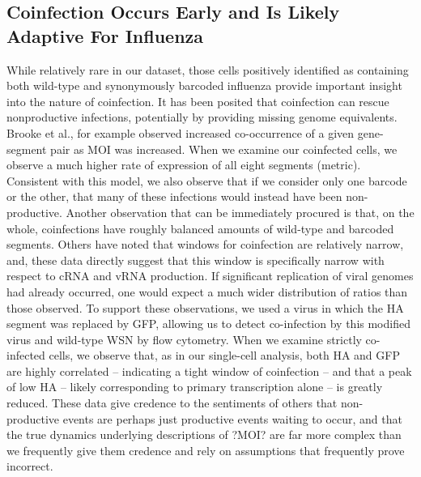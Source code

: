 \documentclass[9pt,lineno]{elife}
\begin{document}
\subsection{Coinfection Occurs Early and Is Likely Adaptive For Influenza}
	While relatively rare in our dataset, those cells positively identified as containing both wild-type and synonymously barcoded influenza provide important insight into the nature of coinfection. It has been posited that coinfection can rescue nonproductive infections, potentially by providing missing genome equivalents. Brooke et al., for example observed increased co-occurrence of a given gene-segment pair as MOI was increased. When we examine our coinfected cells, we observe a much higher rate of expression of all eight segments (metric). Consistent with this model, we also observe that if we consider only one barcode or the other, that many of these infections would instead have been non-productive. Another observation that can be immediately procured is that, on the whole, coinfections have roughly balanced amounts of wild-type and barcoded segments. Others have noted that windows for coinfection are relatively narrow, and, these data directly suggest that this window is specifically narrow with respect to cRNA and vRNA production. If significant replication of viral genomes had already occurred, one would expect a much wider distribution of ratios than those observed. To support these observations, we used a virus in which the HA segment was replaced by GFP, allowing us to detect co-infection by this modified virus and wild-type WSN by flow cytometry. When we examine strictly co-infected cells, we observe that, as in our single-cell analysis, both HA and GFP are highly correlated -- indicating a tight window of coinfection -- and that a peak of low HA -- likely corresponding to primary transcription alone -- is greatly reduced. These data give credence to the sentiments of others that non-productive events are perhaps just productive events waiting to occur, and that the true dynamics underlying descriptions of ?MOI? are far more complex than we frequently give them credence and rely on assumptions that frequently prove incorrect. 
\end{document}
